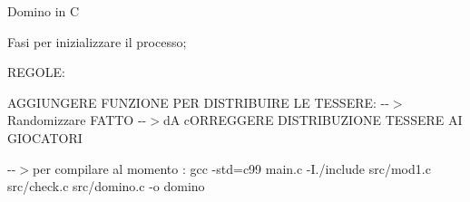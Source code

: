 Domino in C

Fasi per inizializzare il processo;

REGOLE\+:

AGGIUNGERE FUNZIONE PER DISTRIBUIRE LE TESSERE\+: -\/-\/$>$ Randomizzare FATTO -\/-\/$>$dA c\+ORREGGERE DISTRIBUZIONE TESSERE AI GIOCATORI

-\/-\/$>$per compilare al momento \+: gcc -\/std=c99 main.\+c -\/I./include src/mod1.\+c src/check.\+c src/domino.\+c -\/o domino 